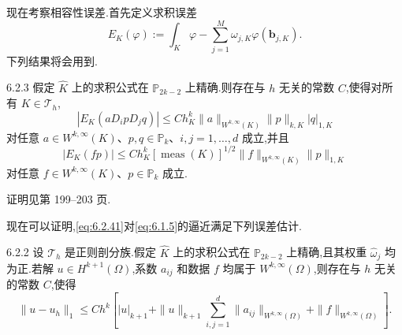 现在考察相容性误差.首先定义求积误差
\begin{equation}\label{eq:6.2.46}
  E_K(\varphi):=\int_K\varphi-\sum_{j=1}^M\omega_{j,K}\varphi(\boldsymbol{b}_{j,K}).
\end{equation}
下列结果将会用到.

\begin{proposition}[]{6.2.3}
假定 \(\widehat K\) 上的求积公式在 \(\mathbb P_{2k-2}\) 上精确.则存在与 \(h\) 无关的常数 \(C\),使得对所有 \(K\in\mathcal T_h\),
\begin{equation}\label{eq:6.2.47}
  |E_K(aD_ipD_jq)|
  \le Ch_K^k\|a\|_{W^{k,\infty}(K)}\|p\|_{k,K}|q|_{1,K}
\end{equation}
对任意 \(a\in W^{k,\infty}(K)\)、\(p,q\in\mathbb P_k\)、\(i,j=1,\ldots,d\) 成立,并且
\begin{equation}\label{eq:6.2.48}
  |E_K(fp)|
  \le Ch_K^k[\operatorname{meas}(K)]^{1/2}\|f\|_{W^{k,\infty}(K)}\|p\|_{1,K}
\end{equation}
对任意 \(f\in W^{k,\infty}(K)\)、\(p\in\mathbb P_k\) 成立.
\end{proposition}

证明见第 199–203 页.

现在可以证明,\eqref{eq:6.2.41}对\eqref{eq:6.1.5}的逼近满足下列误差估计.

\begin{theorem}[]{6.2.2}
设 \(\mathcal T_h\) 是正则剖分族.假定 \(\widehat K\) 上的求积公式在 \(\mathbb P_{2k-2}\) 上精确,且其权重 \(\widehat\omega_j\) 均为正.若解 \(u\in H^{k+1}(\Omega)\),系数 \(a_{ij}\) 和数据 \(f\) 均属于 \(W^{k,\infty}(\Omega)\),则存在与 \(h\) 无关的常数 \(C\),使得
\begin{equation}\label{eq:6.2.49}
  \|u-u_h\|_1
   \le Ch^k\left[|u|_{k+1}
       +\|u\|_{k+1}\sum_{i,j=1}^d\|a_{ij}\|_{W^{k,\infty}(\Omega)}
       +\|f\|_{W^{k,\infty}(\Omega)}\right].
\end{equation}
\end{theorem}

